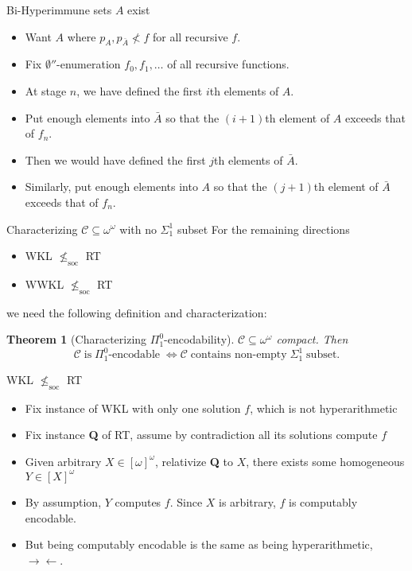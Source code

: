\documentclass[notes]{beamer}
\newtheorem{thm}{Theorem}
\begin{document}
\begin{frame}{Bi-Hyperimmune sets $A$ exist}
  \begin{itemize}
    \item Want $A$ where $p_A,p_{\bar{A}}\not<f$ for all recursive $f$.
    \item Fix $\emptyset''$-enumeration $f_0,f_1,\ldots$ of all recursive
      functions.
    \item At stage $n$, we have defined the first $i$th elements of $A$.
    \item Put enough elements into $\bar{A}$ so that the $(i+1)$th element
      of $A$ exceeds that of $f_n$.
    \item Then we would have defined the first $j$th elements of $\bar{A}$.
    \item Similarly, put enough elements into $A$ so that the $(j+1)$th
      element of $\bar{A}$ exceeds that of $f_n$.
  \end{itemize}
\end{frame}

\begin{frame}{Characterizing $\mathcal{C}\subseteq \omega^{\omega}$ with no
$\Sigma_1^1$ subset}
  For the remaining directions
  \begin{itemize}
    \item WKL $\nleq_{\text{soc}}$ RT
    \item WWKL $\nleq_{\text{soc}}$ RT
  \end{itemize}

  we need the following definition and characterization:

  \begin{thm}[Characterizing $\Pi_1^0$-encodability]
    $\mathcal{C}\subseteq \omega^{\omega}$ compact. Then
    \[\mathcal{C}\; \text{is}\; \Pi_1^0\text{-encodable}\; \Leftrightarrow
    \mathcal{C}\; \text{contains non-empty}\; \Sigma_1^1\; \text{subset}.\]
  \end{thm}
\end{frame}

\begin{frame}{WKL $\nleq_{\text{soc}}$ RT}
  \begin{itemize}
    \item Fix instance of WKL with only one solution $f$, which is
      not hyperarithmetic
    \item Fix instance \textbf{Q} of RT, assume by contradiction all
      its solutions compute $f$ 
    \item Given arbitrary $X\in[\omega]^\omega$, relativize \textbf{Q} to
      $X$, there exists some homogeneous $Y\in[X]^\omega$
    \item By assumption, $Y$ computes $f$. Since $X$ is arbitrary, $f$ is
      computably encodable.
    \item But being computably encodable is the same as being
      hyperarithmetic, $\rightarrow\leftarrow$.
  \end{itemize}
\end{frame}
\end{document}
